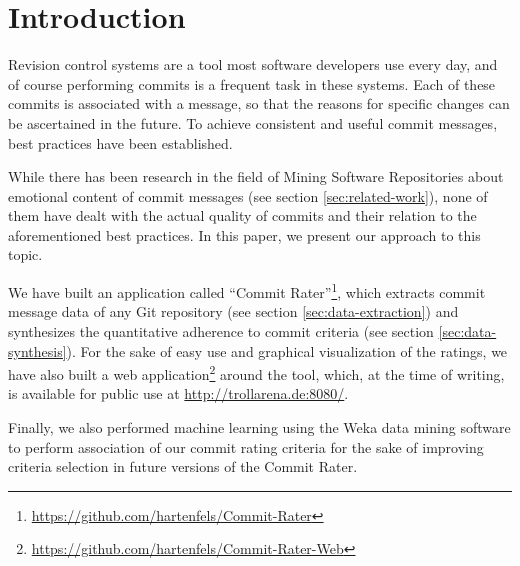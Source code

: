 \section{Introduction}
\label{sec:introduction}

%
%
%
%
%
%

Revision control systems are a tool most software developers use every day, and of course performing commits is a frequent task in these systems. Each of these commits is associated with a message, so that the reasons for specific changes can be ascertained in the future\cite{CB}. To achieve consistent and useful commit messages, best practices have been established\cite{OffGuide,CB,TP,SR}.

While there has been research in the field of Mining Software Repositories about emotional content of commit messages (see section \ref{sec:related-work}), none of them have dealt with the actual quality of commits and their relation to the aforementioned best practices. In this paper, we present our approach to this topic.

We have built an application called ``Commit Rater''\footnote{\url{https://github.com/hartenfels/Commit-Rater}}, which extracts commit message data of any Git repository (see section \ref{sec:data-extraction}) and synthesizes the quantitative adherence to commit criteria (see section \ref{sec:data-synthesis}). For the sake of easy use and graphical visualization of the ratings, we have also built a web application\footnote{\url{https://github.com/hartenfels/Commit-Rater-Web}} around the tool, which, at the time of writing, is available for public use at \url{http://trollarena.de:8080/}.

Finally, we also performed machine learning using the Weka data mining software\cite{Weka} to perform association of our commit rating criteria for the sake of improving criteria selection in future versions of the Commit Rater.
